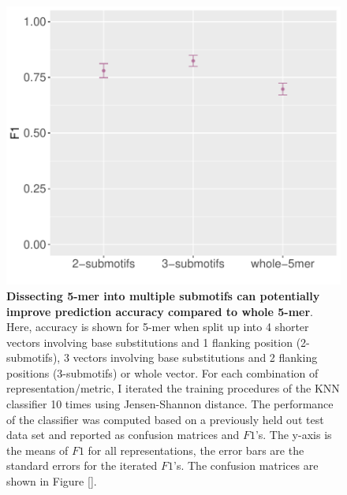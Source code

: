 \begin{figure}[ht!]
    \includegraphics[scale=0.75]{graphics/f1_sce_submotif.pdf}
    \caption{\textbf{Dissecting 5-mer into multiple submotifs can potentially improve prediction accuracy compared to whole 5-mer}. Here, accuracy is shown for 5-mer when split up into 4 shorter vectors involving base substitutions and 1 flanking position (2-submotifs), 3 vectors involving base substitutions and 2 flanking positions (3-submotifs) or whole vector. For each combination of representation/metric, I iterated the training procedures of the KNN classifier 10 times using Jensen-Shannon distance. The performance of the classifier was computed based on a previously held out test data set and reported as confusion matrices and $F1$'s. The y-axis is the means of $F1$ for all representations, the error bars are the standard errors for the iterated $F1$’s. The confusion matrices are shown in Figure \ref{}.}
    \label{fig:f1_sce_submotif}
\end{figure}
